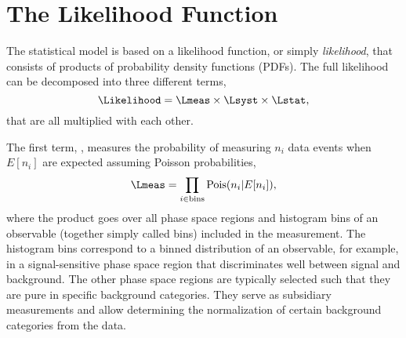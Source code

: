 
\section{The Likelihood Function}
\label{sec:likelihood}
The statistical model is based on a likelihood function, or simply \emph{likelihood}, that consists of products of probability density functions (PDFs). The full likelihood can be decomposed into three different terms,
\begin{equation}
    \label{eq:likelihood-three-terms}
    \Likelihood = \Lmeas \times \Lsyst \times \Lstat,
\end{equation}
that are all multiplied with each other.

The first term, \Lmeas, measures the probability of measuring $n_i$ data events when $E[n_i]$ are expected assuming Poisson probabilities, 
\begin{equation}
    \Lmeas = \prod_{i \in \text{bins}} \text{Pois}(n_i | E[n_i] ),
\end{equation}
where the product goes over all phase space regions and histogram bins of an observable (together simply called bins) included in the measurement. The histogram bins correspond to a binned distribution of an observable, for example, in a signal-sensitive phase space region that discriminates well between signal and background. The other phase space regions are typically selected such that they are pure in specific background categories. They serve as subsidiary measurements and allow determining the normalization of certain background categories from the data.

